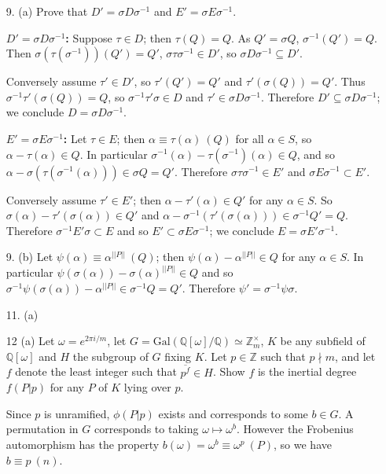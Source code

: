 \documentclass{article}
\newcommand{\w}[0]{\omega}
\newcommand{\Q}[0]{\mathbb{Q}}
\newcommand{\Z}[0]{\mathbb{Z}}
\newcommand{\modequiv}[3]{#1 \equiv #2\ (#3)}
\newcommand{\gal}[2]{\text{Gal}(#1 / #2)}
\begin{document}
\begin{enumerate}
\item[9. (a)] Prove that $D' = \sigma D \sigma^{-1}$ and $E' = \sigma E \sigma^{-1}$.

{\bf $D' = \sigma D \sigma^{-1}$:} Suppose $\tau \in D$; then $\tau(Q) = Q$.  As $Q' = \sigma Q$, $\sigma^{-1}(Q') = Q$.  Then $\sigma(\tau(\sigma^{-1}))(Q') = Q'$, $\sigma \tau \sigma^{-1} \in D'$, so $\sigma D \sigma^{-1} \subseteq D'$.

Conversely assume $\tau' \in D'$, so $\tau'(Q') = Q'$ and $\tau'(\sigma(Q)) = Q'$. Thus $\sigma^{-1} \tau'(\sigma(Q)) = Q$, so $\sigma^{-1} \tau' \sigma \in D$ and $\tau' \in \sigma D \sigma^{-1}$.  Therefore $D' \subseteq \sigma D \sigma^{-1}$; we conclude $D = \sigma D \sigma^{-1}$.

{\bf $E' = \sigma E \sigma^{-1}$: } Let $\tau \in E$; then $\modequiv{\alpha}{\tau(\alpha)}{Q}$ for all $\alpha \in S$, so $\alpha - \tau(\alpha) \in Q$.  In particular $\sigma^{-1}(\alpha) - \tau(\sigma^{-1})(\alpha) \in Q$, and so $\alpha - \sigma(\tau(\sigma^{-1}(\alpha))) \in \sigma Q = Q'$.  Therefore $\sigma \tau \sigma^{-1} \in E'$ and $\sigma E \sigma^{-1} \subset E'$.

Conversely assume $\tau' \in E'$; then $\alpha - \tau'(\alpha) \in Q'$ for any $\alpha \in S$.  So $\sigma(\alpha) - \tau'(\sigma(\alpha)) \in Q'$ and $\alpha - \sigma^{-1}(\tau'(\sigma(\alpha))) \in \sigma^{-1}Q' = Q$.  Therefore $\sigma^{-1} E' \sigma \subset E$ and so $E' \subset \sigma E \sigma^{-1}$; we conclude $E = \sigma E' \sigma^{-1}$.

\item [9. (b)] Let $\modequiv{\psi(\alpha)}{\alpha^{||P||}}{Q}$; then $\psi(\alpha) - \alpha^{||P||} \in Q$ for any $\alpha \in S$.  In particular $\psi(\sigma(\alpha)) - \sigma(\alpha)^{||P||} \in Q$ and so $\sigma^{-1}\psi(\sigma(\alpha)) - \alpha^{||P||} \in \sigma^{-1}Q = Q'$.  Therefore $\psi' = \sigma^{-1}\psi \sigma$.

\item [11. (a)]

\item [12 (a)]  Let $\w = e^{2\pi i / m}$, let $G = \gal{\Q[\omega]}{\Q} \simeq \Z^{\times}_{m}$, $K$ be any subfield of $\Q[\omega]$ and $H$ the subgroup of $G$ fixing $K$.  Let $p \in \Z$ such that $p \nmid m$, and let $f$ denote the least integer such that $\overline{p^f} \in H$.  Show $f$ is the inertial degree $f(P | p)$ for any $P$ of $K$ lying over $p$.

Since $p$ is unramified, $\phi(P | p)$ exists and corresponds to some $b \in G$.  A permutation in $G$ corresponds to taking $\w \mapsto \w^b$.  However the Frobenius automorphism has the property $b(\omega) = \modequiv{\w^{b}}{\w^{p}}{P}$, so we have $\modequiv{b}{p}{n}$.


\end{enumerate}
\end{document}
